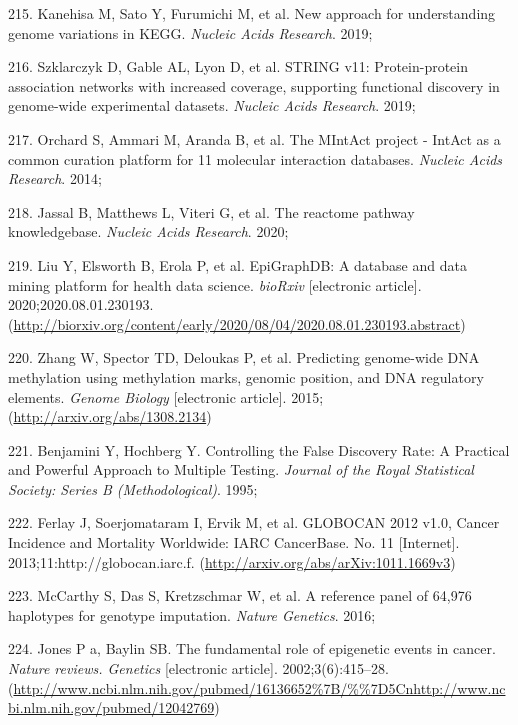 \documentclass[11pt,oneside]{bristolthesis}
\newenvironment{cslreferences}%
  {}%
  {\par}
\begin{document}
\begin{cslreferences}
\leavevmode\hypertarget{ref-Kanehisa2019}{}%
215. Kanehisa M, Sato Y, Furumichi M, et al. New approach for understanding genome variations in KEGG. \emph{Nucleic Acids Research}. 2019;

\leavevmode\hypertarget{ref-Szklarczyk2019}{}%
216. Szklarczyk D, Gable AL, Lyon D, et al. STRING v11: Protein-protein association networks with increased coverage, supporting functional discovery in genome-wide experimental datasets. \emph{Nucleic Acids Research}. 2019;

\leavevmode\hypertarget{ref-Orchard2014}{}%
217. Orchard S, Ammari M, Aranda B, et al. The MIntAct project - IntAct as a common curation platform for 11 molecular interaction databases. \emph{Nucleic Acids Research}. 2014;

\leavevmode\hypertarget{ref-Jassal2020}{}%
218. Jassal B, Matthews L, Viteri G, et al. The reactome pathway knowledgebase. \emph{Nucleic Acids Research}. 2020;

\leavevmode\hypertarget{ref-Liu2020}{}%
219. Liu Y, Elsworth B, Erola P, et al. EpiGraphDB: A database and data mining platform for health data science. \emph{bioRxiv} {[}electronic article{]}. 2020;2020.08.01.230193. (\url{http://biorxiv.org/content/early/2020/08/04/2020.08.01.230193.abstract})

\leavevmode\hypertarget{ref-Zhang2015}{}%
220. Zhang W, Spector TD, Deloukas P, et al. Predicting genome-wide DNA methylation using methylation marks, genomic position, and DNA regulatory elements. \emph{Genome Biology} {[}electronic article{]}. 2015;(\url{http://arxiv.org/abs/1308.2134})

\leavevmode\hypertarget{ref-Benjamini1995}{}%
221. Benjamini Y, Hochberg Y. Controlling the False Discovery Rate: A Practical and Powerful Approach to Multiple Testing. \emph{Journal of the Royal Statistical Society: Series B (Methodological)}. 1995;

\leavevmode\hypertarget{ref-Ferlay2013}{}%
222. Ferlay J, Soerjomataram I, Ervik M, et al. GLOBOCAN 2012 v1.0, Cancer Incidence and Mortality Worldwide: IARC CancerBase. No. 11 {[}Internet{]}. 2013;11:http://globocan.iarc.f. (\url{http://arxiv.org/abs/arXiv:1011.1669v3})

\leavevmode\hypertarget{ref-McCarthy2016}{}%
223. McCarthy S, Das S, Kretzschmar W, et al. A reference panel of 64,976 haplotypes for genotype imputation. \emph{Nature Genetics}. 2016;

\leavevmode\hypertarget{ref-Jones2002}{}%
224. Jones P a, Baylin SB. The fundamental role of epigenetic events in cancer. \emph{Nature reviews. Genetics} {[}electronic article{]}. 2002;3(6):415--28. (\url{http://www.ncbi.nlm.nih.gov/pubmed/16136652\%7B/\%\%7D5Cnhttp://www.ncbi.nlm.nih.gov/pubmed/12042769})


\end{cslreferences}
\end{document}
